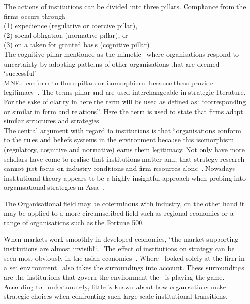 \noindent
The actions of institutions can be divided into three pillars. 
Compliance from the firms occurs through \\
(1) expedience (regulative or coercive pillar),\\
(2) social obligation (normative pillar), or \\
(3) on a taken for granted basis (cognitive pillar) \\
 
 The cognitive pillar mentioned as the mimetic \iso~where organisations respond to uncertainty by adopting patterns of other organisations that are deemed `successful'~\cite{Westney:2005,Peng:2008,Kostova:1999,DiMaggio:1983,Scott:1995}\\ 
\glspl{MNE}~conform to these pillars or isomorphisms because these provide legitimacy~\cite{Powell:1991}.
The terms pillar and \iso are used interchangeable in strategic literature. 
For the sake of clarity in here the term \iso will be used as defined as: ``corresponding or similar in form and relations''. Here the term is used to state that firms adopt similar structures and strategies.\\

The central argument with regard to institutions is that “organisations conform to the rules and beliefs systems in the environment because this isomorphism (regulatory, cognitive and normative) earns them legitimacy.
Not only have more scholars have come to realise that institutions matter and, that strategy research cannot just focus on industry conditions and firm resources alone~\cite{Powell:1991,Scott:1995}.
Nowadays institutional theory appears to be a highly insightful approach when probing into organisational strategies in Asia~\cite{Hoskisson:2000}.


\cite{Westney:2005} The Organisational field may be coterminous with industry, on the other hand it may be applied to a more circumscribed field such as regional economies or a range of organisations such as the Fortune 500.


 


When markets work smoothly in developed economies, ``the market-supporting institutions are almost invisibl``.~\cite{McMillan:2008}
The effect of institutions on strategy can be seen most obviously in the asian economies~\cite{Peng:2002}.
Where \rbv~looked solely at the firm in a set environment \ibv~also takes the surroundings into account. These surroundings are the institutions that govern the environment the \mne~is playing the game. \\

According to~\cite{Peng:2003} unfortunately, little is known about how organisations make strategic choices when confronting such large-scale institutional transitions.